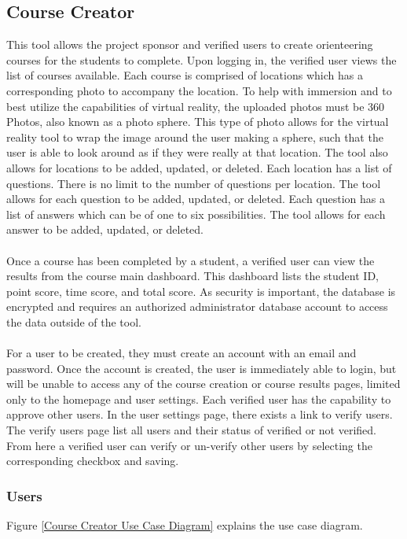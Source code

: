 \subsection{Course Creator}
This tool allows the project sponsor and verified users to create orienteering courses for the students to complete. Upon logging in, the verified user views the list of courses available. Each course is comprised of locations which has a corresponding photo to accompany the location. To help with immersion and to best utilize the capabilities of virtual reality, the uploaded photos must be 360 Photos, also known as a photo sphere. This type of photo allows for the virtual reality tool to wrap the image around the user making a sphere, such that the user is able to look around as if they were really at that location. The tool also allows for locations to be added, updated, or deleted. Each location has a list of questions. There is no limit to the number of questions per location. The tool allows for each question to be added, updated, or deleted. Each question has a list of answers which can be of one to six possibilities. The tool allows for each answer to be added, updated, or deleted. \\
\\
Once a course has been completed by a student, a verified user can view the results from the course main dashboard. This dashboard lists the student ID, point score, time score, and total score. As security is important, the database is encrypted and requires an authorized administrator database account to access the data outside of the tool. \\
\\
For a user to be created, they must create an account with an email and password. Once the account is created, the user is immediately able to login, but will be unable to access any of the course creation or course results pages, limited only to the homepage and user settings. Each verified user has the capability to approve other users. In the user settings page, there exists a link to verify users. The verify users page list all users and their status of verified or not verified. From here a verified user can verify or un-verify other users by selecting the corresponding checkbox and saving. 


\subsubsection{Users}
Figure \ref{Course Creator Use Case Diagram} explains the use case diagram.

